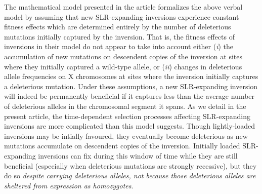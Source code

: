 \documentclass{article}
\begin{document}
\begin{appendices}
\noindent The mathematical model presented in the article formalizes the above verbal model by assuming that new SLR-expanding inversions experience constant fitness effects which are determined entirely by the number of deleterious mutations initially captured by the inversion. That is, the fitness effects of inversions in their model do not appear to take into account either ({\itshape i}) the accumulation of new mutations on descendent copies of the inversion at sites where they initially captured a wild-type allele, or ({\itshape ii}) changes in deleterious allele frequencies on X chromosomes at sites where the inversion initially captures a deleterious mutation. Under these assumptions, a new SLR-expanding inversion will indeed be permanently beneficial if it captures less than the average number of deleterious alleles in the chromosomal segment it spans. As we detail in the present article, the time-dependent selection processes affecting SLR-expanding inversions are more complicated than this model suggests. Though lightly-loaded inversions may be intially favoured, they eventually become deleterious as new mutations accumulate on descendent copies of the inversion. Initially loaded SLR-expanding inversions can fix during this window of time while they are still beneficial (especially when deleterious mutations are strongly recessive), but they do so {\itshape despite carrying deleterious alleles, not because those deleterious alleles are sheltered from expression as homozygotes}.






\end{appendices}
\end{document}
